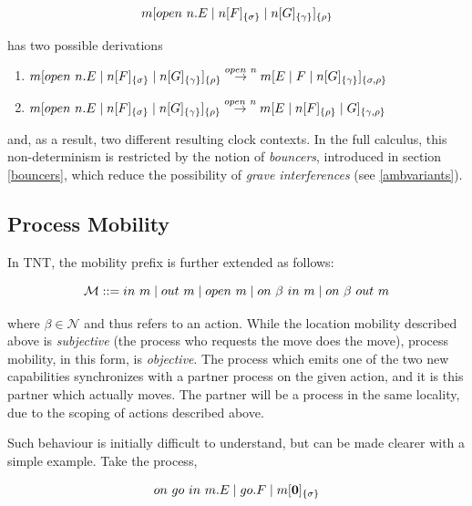 \begin{equation}
{m}[ open\ n.E\;|\;{n}[ F ]_{\{\sigma\}}\;|\;{n}[ G ]_{\{\gamma\}} ]_{\{\rho\}}
\end{equation}

\noindent has two possible derivations

\begin{enumerate}
\item
      ${m}[ open\ n.E\;|\;{n}[ F ]_{\{\sigma\}}\;|\;{n}[ G ]_{\{\gamma\}} ]_{\{\rho\}}
      \stackrel{open\ n}{\rightarrow} {m}[ E \;|\; F \;|\;
      {n}[ G ]_{\{\gamma\}} ]_{\{\sigma , \rho\}}$
\item
      ${m}[ open\ n.E\;|\;{n}[ F ]_{\{\sigma\}}\;|\;{n}[ G ]_{\{\gamma\}} ]_{\{\rho\}}
      \stackrel{open\ n}{\rightarrow} {m}[ E \;|\; {n}[ F ]_{\{\rho\}} \;|\; G ]_{\{\gamma , \rho\}}$
\end{enumerate}

\noindent and, as a result, two different resulting clock contexts.  In
the full calculus, this non-determinism is restricted by the notion of
\emph{bouncers}, introduced in section \ref{bouncers}, which reduce the possibility of \emph{grave interferences} (see \ref{ambvariants}).  

\subsection{Process Mobility}
\label{procmob}

In TNT, the mobility prefix is further extended as follows:

\begin{equation}
    \text{$\mathcal{M}$} ::= in\ m \;|\; out\ m \;|\; open\ m \;|\;
     on\ \beta\ in\ m \;|\; on\ \beta\ out\ m
\end{equation}

\noindent where $\beta \in \mathcal{N}$ and thus refers to an action.
While the location mobility described above is \emph{subjective} (the
process who requests the move does the move), process mobility, in this form,
is \emph{objective}.  The process which emits one of the two new
capabilities synchronizes with a partner process on the given action,
and it is this partner which actually moves.  The partner will be a
process in the same locality, due to the scoping of actions described
above.

Such behaviour is initially difficult to understand, but can be made
clearer with a simple example.  Take the process,

\begin{equation}
on\ go\ in\ m.E \;|\; go.F \;|\; {m}[ \textbf{0} ]_{\{\sigma\}}
\end{equation}

